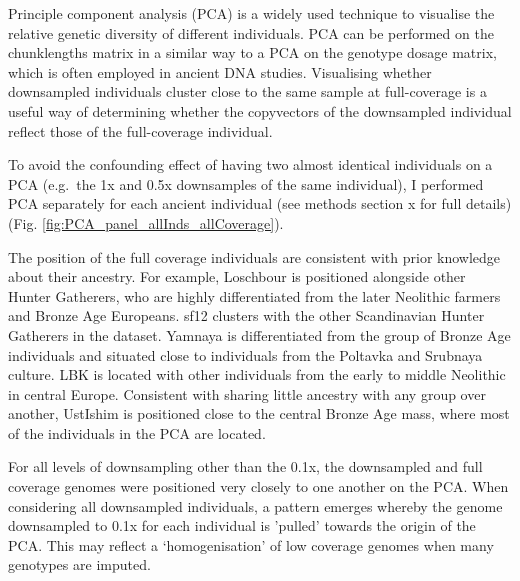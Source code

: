 Principle component analysis (PCA) is a widely used technique to visualise the relative genetic diversity of different individuals. PCA can be performed on the chunklengths matrix in a similar way to a PCA on the genotype dosage matrix, which is often employed in ancient DNA studies. Visualising whether downsampled individuals cluster close to the same sample at full-coverage is a useful way of determining whether the copyvectors of the downsampled individual reflect those of the full-coverage individual.

To avoid the confounding effect of having two almost identical individuals on a PCA (e.g.\ the 1x and 0.5x downsamples of the same individual), I performed PCA separately for each ancient individual (see methods section x for full details) (Fig. \ref{fig:PCA_panel_allInds_allCoverage}). 

The position of the full coverage individuals are consistent with prior knowledge about their ancestry. For example, Loschbour is positioned alongside other Hunter Gatherers, who are highly differentiated from the later Neolithic farmers and Bronze Age Europeans. sf12 clusters with the other Scandinavian Hunter Gatherers in the dataset. Yamnaya is differentiated from the group of Bronze Age individuals and situated close to individuals from the Poltavka and Srubnaya culture. LBK is located with other individuals from the early to middle Neolithic in central Europe. Consistent with sharing little ancestry with any group over another, UstIshim is positioned close to the central Bronze Age mass, where most of the individuals in the PCA are located. 

For all levels of downsampling other than the 0.1x, the downsampled and full coverage genomes were positioned very closely to one another on the PCA. When considering all downsampled individuals, a pattern emerges whereby the genome downsampled to 0.1x for each individual is 'pulled' towards the origin of the PCA. This may reflect a `homogenisation' of low coverage genomes when many genotypes are imputed.

